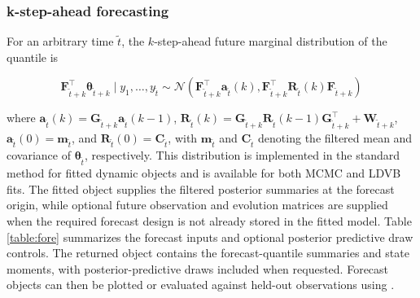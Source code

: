 \documentclass{jss}
\newcommand{\vect}[1]{\boldsymbol{#1}}
\newcommand{\mat}[1]{\mathbf{#1}}
\newcommand{\N}{\mathcal{N}}
\begin{document}
\subsubsection{k-step-ahead forecasting}

For an arbitrary time $\tilde{t}$, the $k$-step-ahead future marginal distribution of the quantile is

\begin{equation}
\mat{F}_{\tilde{t}+k}^\top \vect{\theta}_{\tilde{t}+k}\mid y_1,\dots,y_{\tilde{t}} \sim \N(\mat{F}_{\tilde{t}+k}^\top \mat{a}_{\tilde{t}}(k),\mat{F}_{\tilde{t}+k}^\top\mat{R}_{\tilde{t}}(k)\mat{F}_{\tilde{t}+k})
\label{eq:forecast_recursion}
\end{equation}

where $\mat{a}_{\tilde{t}}(k) = \mat{G}_{\tilde{t}+k} \mat{a}_{\tilde{t}}(k-1)$, $\mat{R}_{\tilde{t}}(k) = \mat{G}_{\tilde{t}+k} \mat{R}_{\tilde{t}}(k-1) \mat{G}_{\tilde{t}+k}^\top + \mat{W}_{\tilde{t}+k}$, $\mat{a}_{\tilde{t}}(0) = \mat{m}_{\tilde{t}}$, and $\mat{R}_{\tilde{t}}(0) = \mat{C}_{\tilde{t}}$, with $\mat{m}_{\tilde{t}}$ and $\mat{C}_{\tilde{t}}$ denoting the filtered mean and covariance of $\vect{\theta}_{\tilde{t}}$, respectively. This distribution is implemented in the standard  method for fitted dynamic objects and is available for both MCMC and LDVB fits. The fitted object supplies the filtered posterior summaries at the forecast origin, while optional future observation and evolution matrices are supplied when the required forecast design is not already stored in the fitted model. Table \ref{table:fore} summarizes the forecast inputs and optional posterior predictive draw controls. The returned
 object contains the forecast-quantile summaries and state moments, with posterior-predictive draws included when requested. Forecast objects can then be plotted or evaluated against held-out observations using .
\end{document}
